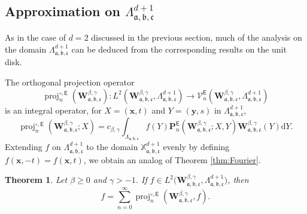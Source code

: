 \documentclass{amsart}
\newtheorem{thm}{Theorem}[section]
\theoremstyle{remark}
\def\d{\mathrm{d}}
\def\sE{{\mathsf E}}
\def\fa{{\mathfrak a}}
\def\fb{{\mathfrak b}}
\def\fc{{\mathfrak c}}
\def\b{{\beta}}
\def\g{{\gamma}}
\def\xb{{\mathbf x}}
\def\yb{{\mathbf y}}
\def\Pb{{\mathbf P}}
\def\Wb{{\mathbf W}}
\def\CV{{\mathcal V}}
\def\XX{{\mathbb X}}
\def\proj{\operatorname{proj}}
\begin{document}
\subsection{Approximation on $\Lambda_{\fa,\fb,\fc}^{d+1}$}
As in the case of $d =2$ discussed in the previous section, much of the analysis on the domain
$\Lambda_{\fa,\fb,\fc}^{d+1}$ can be deduced from the corresponding results on the unit disk.

The orthogonal projection operator 
$$
 \proj_n^{\circ, \sE}\left( \Wb_{\fa,\fb,\fc}^{\b,\g}\right):  L^2\left(\Wb_{\fa,\fb,\fc}^{\b,\g}, \Lambda_{\fa,\fb,\fc}^{d+1}\right)
 \to  \CV_n^\sE\left(\Wb_{\fa,\fb,\fc}^{\b,\g}, \Lambda_{\fa,\fb,\fc}^{d+1}\right)
$$
is an integral operator, for $X = (\xb,t)$ and $Y =(\yb,s)$ in $ \Lambda_{\fa,\fb,\fc}^{d+1}$,
$$
 \proj_n^{\circ, \sE}\left( \Wb_{\fa,\fb,\fc}^{\b,\g}; X \right) =
 c_{\b,\g} \int_{\Lambda_{\fa,\fb,\fc}} f(Y) \Pb_n^\sE \left(\Wb_{\fa,\fb,\fc}^{\b,\g}; X, Y\right)
 \Wb_{\fa,\fb,\fc}^{\b,\g}(Y) \d Y.
$$
Extending $f$ on $\Lambda_{\fa,\fb,\fc}^{d+1}$ to the domain $\XX_{\fa,\fb,\fc}^{d+1}$ evenly by
defining $f(\xb, -t) = f(\xb,t)$, we obtain an analog of Theorem \ref{thm:Fourier}. 

\begin{thm} \label{thm:Fourier-d}
Let $\b\ge 0$ and $\g > -1$. If $f \in  L^2\big(\Wb_{\fa,\fb,\fc}^{\b,\g}, \Lambda_{\fa,\fb,\fc}^{d+1}\big)$, then 
\begin{equation}\label{eq:Fourier-d}
        f = \sum_{n=0}^\infty \proj_n^{\circ, \sE}\left( \Wb_{\fa,\fb,\fc}^{\b,\g}, f\right). 
\end{equation}
\end{thm}
\end{document}
